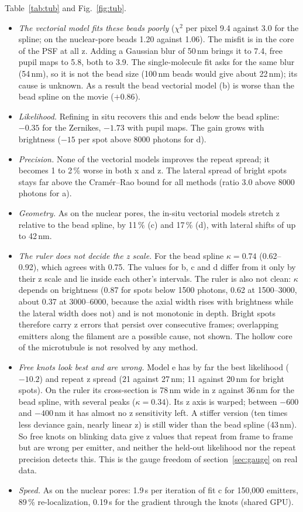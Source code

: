 \documentclass[11pt,a4paper]{article}
\begin{document}
Table~\ref{tab:tub} and Fig.~\ref{fig:tub}.
\begin{itemize}\setlength\itemsep{0pt}
\item \emph{The vectorial model fits these beads poorly} ($\chi^2$ per pixel 9.4 against 3.0 for the spline;
on the nuclear-pore beads 1.20 against 1.06). The misfit is in the core of the PSF at all z. Adding a Gaussian
blur of 50\,nm brings it to 7.4, free pupil maps to 5.8, both to 3.9. The single-molecule fit asks for the
same blur (54\,nm), so it is not the bead size (100\,nm beads would give about 22\,nm); its cause is unknown.
As a result the bead vectorial model (b) is worse than the bead spline on the movie ($+0.86$).
\item \emph{Likelihood.} Refining in situ recovers this and ends below the bead spline: $-0.35$ for the
Zernikes, $-1.73$ with pupil maps. The gain grows with brightness ($-15$ per spot above 8000 photons for d).
\item \emph{Precision.} None of the vectorial models improves the repeat spread; it becomes 1 to 2\,\% worse in
both x and z. The lateral spread of bright spots stays far above the Cram\'er--Rao bound for all methods
(ratio 3.0 above 8000 photons for a).
\item \emph{Geometry.} As on the nuclear pores, the in-situ vectorial models stretch z relative to the bead
spline, by 11\,\% (c) and 17\,\% (d), with lateral shifts of up to 42\,nm.
\item \emph{The ruler does not decide the z scale.} For the bead spline $\kappa=0.74$ (0.62--0.92), which
agrees with 0.75. The values for b, c and d differ from it only by their z scale and lie inside each other's
intervals. The ruler is also not clean: $\kappa$ depends on brightness (0.87 for spots below 1500 photons, 0.62
at 1500--3000, about 0.37 at 3000--6000, because the axial width rises with brightness while the lateral width
does not) and is not monotonic in depth. Bright spots therefore carry z errors that persist over consecutive
frames; overlapping emitters along the filament are a possible cause, not shown. The hollow core of the
microtubule is not resolved by any method.
\item \emph{Free knots look best and are wrong.} Model e has by far the best likelihood ($-10.2$) and repeat
z spread (21 against 27\,nm; 11 against 20\,nm for bright spots). On the ruler its cross-section is 78\,nm wide
in z against 36\,nm for the bead spline, with several peaks ($\kappa=0.34$). Its z axis is warped; between
$-600$ and $-400$\,nm it has almost no z sensitivity left. A stiffer version (ten times less deviance gain,
nearly linear z) is still wider than the bead spline (43\,nm). So free knots on blinking data give z values
that repeat from frame to frame but are wrong per emitter, and neither the held-out likelihood nor the repeat
precision detects this. This is the gauge freedom of section~\ref{sec:gauge} on real data.
\item \emph{Speed.} As on the nuclear pores: 1.9\,s per iteration of fit c for 150{,}000 emitters, 89\,\%
re-localization, 0.19\,s for the gradient through the knots (shared GPU).
\end{itemize}
\end{document}
